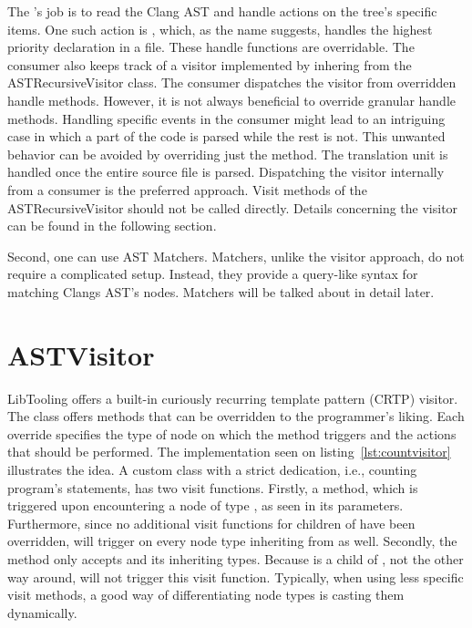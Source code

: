 The 's job is to read the Clang AST and handle actions
on the tree's specific items. 
One such action is , which, as the name suggests,
handles the highest priority declaration in a file. 
These handle functions are overridable. 
The consumer also keeps track of a visitor implemented by inhering from 
the ASTRecursiveVisitor class. 
The consumer dispatches the visitor from overridden handle methods. 
However, it is not always beneficial to override granular handle methods. 
Handling specific events in the consumer might lead to an intriguing case 
in which a part of the code is parsed while the rest is not. 
This unwanted behavior can be avoided by overriding just 
the  method. 
The translation unit is handled once the entire source file is parsed. 
Dispatching the visitor internally from a consumer is the preferred 
approach. 
Visit methods of the ASTRecursiveVisitor should not be called directly. 
Details concerning the visitor can be found in the following section.

Second, one can use AST Matchers. 
Matchers, unlike the visitor approach, do not require a complicated setup. 
Instead, they provide a query-like syntax for matching Clangs AST's nodes. 
Matchers will be talked about in detail later.

\section{ASTVisitor}

LibTooling offers a built-in curiously recurring template pattern 
(CRTP) visitor. 
The class  offers  methods that 
can be overridden to the programmer's liking. 
Each override specifies the type of node on which the method 
triggers and the actions that should be performed.
The implementation seen on listing~\ref{lst:countvisitor} illustrates
the idea. A custom class with a strict dedication, i.e., counting
program's statements, has two visit functions.
Firstly, a  method, which is triggered upon
encountering a node of type , as seen in its
parameters. 
Furthermore, since no additional visit functions for children 
of  have been overridden, 
will trigger on every node type inheriting from  as well.
Secondly, the method  only accepts 
and its inheriting types.
Because  is a child of , not the other way
around,  will not trigger this visit function.
Typically, when using less specific visit methods, a good 
way of differentiating node types is casting them dynamically.

